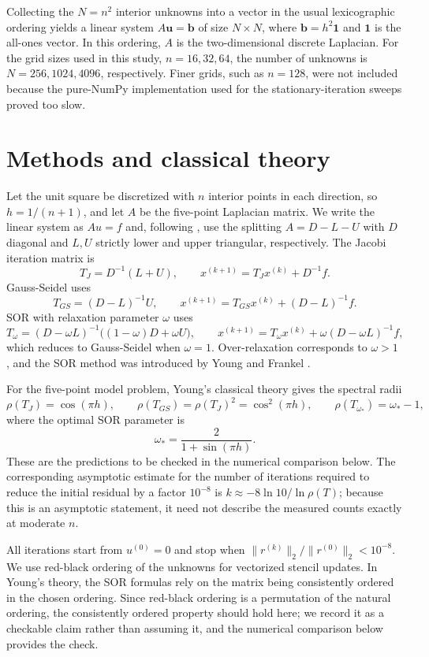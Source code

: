 \documentclass[11pt]{article}
\begin{document}
Collecting the \(N=n^2\) interior unknowns into a vector in the usual lexicographic ordering yields a linear system \(A\mathbf{u}=\mathbf{b}\) of size \(N\times N\), where \(\mathbf{b}=h^2\mathbf{1}\) and \(\mathbf{1}\) is the all-ones vector. In this ordering, \(A\) is the two-dimensional discrete Laplacian. For the grid sizes used in this study, \(n=16,32,64\), the number of unknowns is \(N=256,1024,4096\), respectively. Finer grids, such as \(n=128\), were not included because the pure-NumPy implementation used for the stationary-iteration sweeps proved too slow.
\section{Methods and classical theory}
Let the unit square be discretized with \(n\) interior points in each direction, so \(h=1/(n+1)\), and let \(A\) be the five-point Laplacian matrix. We write the linear system as \(Au=f\) and, following \cite{buchanan2022jacobi}, use the splitting \(A=D-L-U\) with \(D\) diagonal and \(L,U\) strictly lower and upper triangular, respectively. The Jacobi iteration matrix is
\[ T_J=D^{-1}(L+U),\qquad x^{(k+1)}=T_Jx^{(k)}+D^{-1}f. \]
Gauss-Seidel uses
\[ T_{GS}=(D-L)^{-1}U,\qquad x^{(k+1)}=T_{GS}x^{(k)}+(D-L)^{-1}f. \]
SOR with relaxation parameter \(\omega\) \cite{contributorssuccessive} uses
\[ T_\omega=(D-\omega L)^{-1}\big((1-\omega)D+\omega U\big),\qquad x^{(k+1)}=T_\omega x^{(k)}+\omega(D-\omega L)^{-1}f, \]
which reduces to Gauss-Seidel when \(\omega=1\). Over-relaxation corresponds to \(\omega>1\) \cite{contributorssuccessive}, and the SOR method was introduced by Young and Frankel \cite{contributorssuccessive}.

For the five-point model problem, Young's classical theory gives the spectral radii
\[ \rho(T_J)=\cos(\pi h),\qquad \rho(T_{GS})=\rho(T_J)^2=\cos^2(\pi h),\qquad \rho(T_{\omega_\ast})=\omega_\ast-1, \]
where the optimal SOR parameter is
\[ \omega_\ast=\frac{2}{1+\sin(\pi h)}. \]
These are the predictions to be checked in the numerical comparison below. The corresponding asymptotic estimate for the number of iterations required to reduce the initial residual by a factor \(10^{-8}\) is \(k\approx -8\ln 10/\ln\rho(T)\); because this is an asymptotic statement, it need not describe the measured counts exactly at moderate \(n\).

All iterations start from \(u^{(0)}=0\) and stop when \(\|r^{(k)}\|_2/\|r^{(0)}\|_2<10^{-8}\). We use red-black ordering of the unknowns for vectorized stencil updates. In Young's theory, the SOR formulas rely on the matrix being consistently ordered in the chosen ordering. Since red-black ordering is a permutation of the natural ordering, the consistently ordered property should hold here; we record it as a checkable claim rather than assuming it, and the numerical comparison below provides the check.
\end{document}
